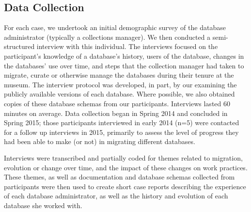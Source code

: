 \subsection{Data Collection}

For each case, we undertook an initial demographic survey of the database administrator (typically a collections manager). We then conducted a semi-structured interview with this individual. The interviews focused on the participant's knowledge of a database's history, users of the database, changes in the databases’ use over time, and steps that the collection manager had taken to migrate, curate or otherwise manage the databases during their tenure at the museum. The interview protocol was developed, in part, by our examining the publicly available versions of each database. Where possible, we also obtained copies of these database schemas from our participants. Interviews lasted 60 minutes on average. Data collection began in Spring 2014 and concluded in Spring 2015; those participants interviewed in early 2014 (n=5) were contacted for a follow up interviews in 2015, primarily to assess the level of progress they had been able to make (or not) in migrating different databases.

Interviews were transcribed and partially coded for themes related to migration, evolution or change over time, and the impact of these changes on work practices. These themes, as well as documentation and database schemas collected from participants were then used to create short case reports describing the experience of each database administrator, as well as the history and evolution of each database she worked with. \ 